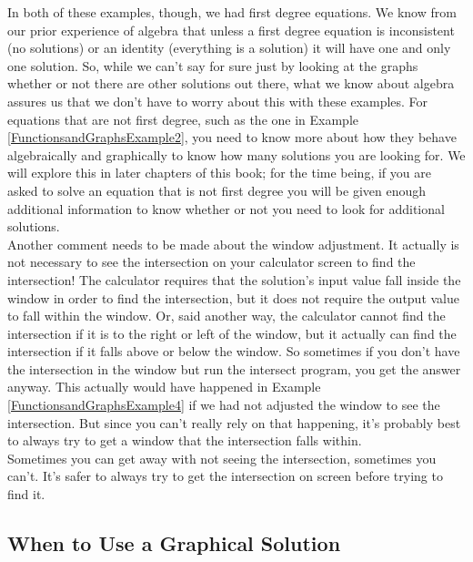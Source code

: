 In both of these examples, though, we had first degree equations. We know from our prior experience of algebra that unless a first degree equation is inconsistent (no solutions) or an identity (everything is a solution) it will have one and only one solution. So, while we can’t say for sure just by looking at the graphs whether or not there are other solutions out there, what we know about algebra assures us that we don’t have to worry about this with these examples. For equations that are not first degree, such as the one in Example \ref{FunctionsandGraphsExample2}, you need to know more about how they behave algebraically and graphically to know how many solutions you are looking for. We will explore this in later chapters of this book; for the time being, if you are asked to solve an equation
that is not first degree you will be given enough additional information to know whether or not you need to look for additional solutions.\\

Another comment needs to be made about the window adjustment. It actually is not necessary to see the intersection on your calculator screen to find the intersection! The calculator requires that the solution’s input value fall inside the window in order to find the intersection, but it does not
require the output value to fall within the window. Or, said another way, the calculator cannot find the intersection if it is to the right or left of the window, but it actually can find the intersection if it falls above or below the window. So sometimes if you don’t have the intersection in the window but
run the intersect program, you get the answer anyway. This actually would have happened in Example \ref{FunctionsandGraphsExample4} if we had not adjusted the window to see the intersection. But since you can’t really rely on that happening, it’s probably best to always try to get a window that the intersection
falls within.\\

Sometimes you can get away with not seeing the intersection, sometimes you can’t. It’s safer to always try to get the intersection on screen before trying to find it.

%
%

\subsection{When to Use a Graphical Solution}

